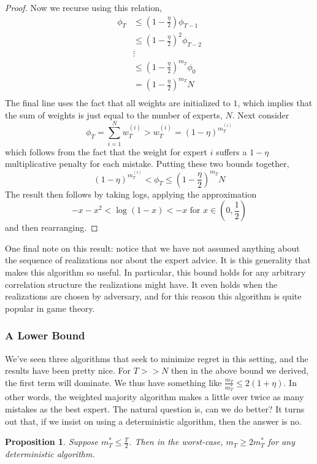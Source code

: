 \documentclass[12pt]{article}
\newtheorem{prop}{Proposition}
\begin{document}
\begin{proof}
Now we recurse using this relation, 
\begin{align*}
\phi_T &\leq \left(1 - \frac{\eta}{2}\right)\phi_{T - 1} \\
	  &\leq \left(1 - \frac{\eta}{2}\right)^2\phi_{T - 2} \\
	  &\vdots \\
	  &\leq \left(1 - \frac{\eta}{2}\right)^{m_T}\phi_{0} \\
	  &= \left(1 - \frac{\eta}{2}\right)^{m_T} N \\
\end{align*}
The final line uses the fact that all weights are initialized to $1$, which implies that the sum of weights is
just equal to the number of experts, $N$. Next consider
\[\phi_T = \sum_{i = 1}^{N} w_T^{(i)} > w_T^{(i)} = (1 - \eta)^{m_T^{(i)}}\]
which follows from the fact that the weight for expert $i$ suffers a $1 - \eta$ multiplicative penalty for each mistake. Putting these two bounds together, 
\[(1 - \eta)^{m_T^{(i)}} < \phi_T \leq \left(1 - \frac{\eta}{2}\right)^{m_T}N\]
The result then follows by taking logs, applying the approximation 
\[-x - x^2 < \log(1 - x) < -x \text{ for } x \in \left(0, \frac{1}{2}\right)\]
and then rearranging. 
\end{proof}

One final note on this result: notice that we have not assumed anything about the sequence of realizations nor about the expert advice. It is this generality that makes this algorithm 
so useful. In particular, this bound holds for any arbitrary correlation structure the realizations might have. It even holds when the realizations are chosen by adversary, and for this 
reason this algorithm is quite popular in game theory. 


\subsubsection{A Lower Bound}
We've seen three algorithms that seek to minimize regret in this setting, and the results have been pretty nice. For $T >> N$ then in the above bound we derived, the first term will dominate. We thus have 
something like $\frac{m_T}{m_T^*} \leq 2(1 + \eta)$. In other words, the weighted majority algorithm makes a little over twice as many mistakes as the best expert.
The natural question is, can we do better? It turns out that, if we insist on using a deterministic algorithm, then the answer is no. 
\begin{prop}
Suppose $m_T^* \leq \frac{T}{2}$. Then in the worst-case, $m_T \geq 2m_T^*$ for any deterministic algorithm. 
\end{prop} 
\end{document}
